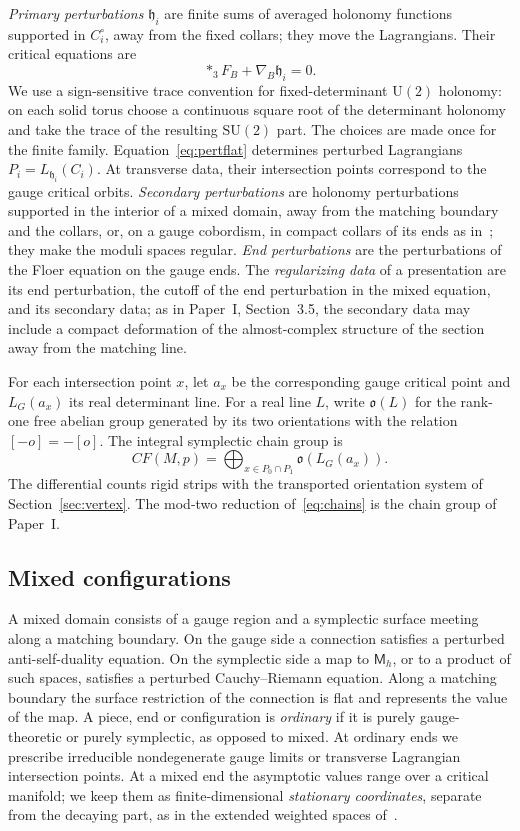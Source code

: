 \documentclass[11pt]{amsart}
\theoremstyle{definition}
\theoremstyle{remark}
\theoremstyle{plain}
\numberwithin{equation}{section}
\newcommand{\SU}{\mathrm{SU}}
\newcommand{\U}{\mathrm U}
\newcommand{\CF}{\mathit{CF}}
\newcommand{\Msf}{\mathsf M}
\newcommand{\orZ}{\mathfrak o}
\begin{document}
\emph{Primary perturbations} $\mathfrak h_i$ are finite sums of averaged holonomy
functions supported in $C_i^\circ$, away from the fixed collars; they move the Lagrangians.
Their critical equations are
\begin{equation}\label{eq:pertflat}
 *_3F_B+\nabla_B\mathfrak h_i=0.
\end{equation}
We use a sign-sensitive trace convention for fixed-determinant
$\U(2)$ holonomy: on each solid torus choose a continuous square
root of the determinant holonomy and take the trace of the resulting
$\SU(2)$ part. The choices are made once for the finite family.
Equation~\eqref{eq:pertflat} determines perturbed Lagrangians
$P_i=L_{\mathfrak h_i}(C_i)$. At transverse data, their intersection points
correspond to the gauge critical orbits. \emph{Secondary perturbations} are holonomy perturbations supported in the interior of a mixed domain, away from the matching boundary and the collars, or, on a gauge cobordism, in compact collars of its ends as in~\cite[Section~3.7]{KM-unknot}; they make the moduli spaces regular. \emph{End perturbations} are the perturbations of the Floer
equation on the gauge ends. The \emph{regularizing data} of a presentation are its end
perturbation, the cutoff of the end perturbation in the mixed equation, and its secondary data; as
in Paper~I, Section~3.5, the secondary data may include a compact deformation of the almost-complex
structure of the section away from the matching line.

For each intersection point $x$, let $a_x$ be the corresponding
gauge critical point and $L_G(a_x)$ its real determinant line.
For a real line $L$, write $\orZ(L)$ for the rank-one free abelian
group generated by its two orientations with the relation
$[-o]=-[o]$. The integral symplectic chain group is
\begin{equation}\label{eq:chains}
 \CF(M,p)=\bigoplus_{x\in P_0\cap P_1}\orZ(L_G(a_x)).
\end{equation}
The differential counts rigid strips with the transported
orientation system of Section~\ref{sec:vertex}. The mod-two
reduction of~\eqref{eq:chains} is the chain group of Paper~I.

\subsection{Mixed configurations}
A mixed domain consists of a gauge region and a symplectic surface
meeting along a matching boundary. On the gauge side a connection
satisfies a perturbed anti-self-duality equation. On the symplectic
side a map to $\Msf_h$, or to a product of such spaces, satisfies a
perturbed Cauchy--Riemann equation. Along a matching boundary the
surface restriction of the connection is flat and represents the
value of the map. A piece, end or configuration is \emph{ordinary} if it is purely gauge-theoretic or purely symplectic, as opposed to mixed. At ordinary ends we prescribe irreducible
nondegenerate gauge limits or transverse Lagrangian intersection
points. At a mixed end the asymptotic values range over a critical manifold; we keep them as
finite-dimensional \emph{stationary coordinates}, separate from the decaying part, as in the
extended weighted spaces of~\cite[Definition~3.9]{DFL}.
\end{document}
